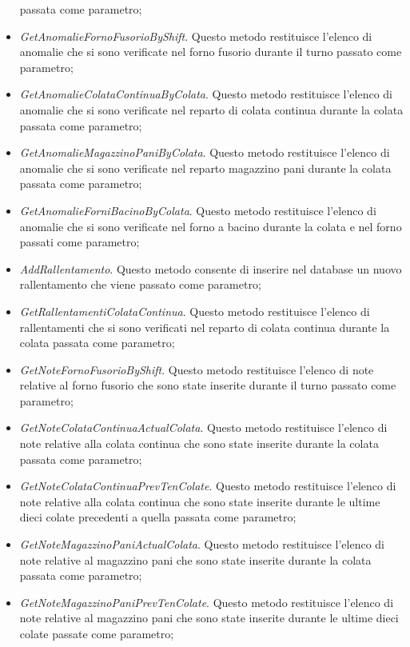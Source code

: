\begin{itemize}
    passata come parametro;
    \item \textit{GetAnomalieFornoFusorioByShift}. Questo metodo restituisce l'elenco di anomalie che si sono
    verificate nel forno fusorio durante il turno passato come parametro;
    \item \textit{GetAnomalieColataContinuaByColata}. Questo metodo restituisce l'elenco di anomalie che si sono
    verificate nel reparto di colata continua durante la colata passata come parametro;
    \item \textit{GetAnomalieMagazzinoPaniByColata}. Questo metodo restituisce l'elenco di anomalie che si sono
    verificate nel reparto magazzino pani durante la colata passata come parametro;
    \item \textit{GetAnomalieForniBacinoByColata}. Questo metodo restituisce l'elenco di anomalie che si sono
    verificate nel forno a bacino durante la colata e nel forno passati come parametro;
    \item \textit{AddRallentamento}. Questo metodo consente di inserire nel database un nuovo rallentamento che
    viene passato come parametro;
    \item \textit{GetRallentamentiColataContinua}. Questo metodo restituisce l'elenco di rallentamenti che si sono
    verificati nel reparto di colata continua durante la colata passata come parametro;
    \item \textit{GetNoteFornoFusorioByShift}. Questo metodo restituisce l'elenco di note relative al forno fusorio che
    sono state inserite durante il turno passato come parametro;
    \item \textit{GetNoteColataContinuaActualColata}. Questo metodo restituisce l'elenco di note relative alla colata
    continua che sono state inserite durante la colata passata come parametro;
    \item \textit{GetNoteColataContinuaPrevTenColate}. Questo metodo restituisce l'elenco di note relative alla colata
    continua che sono state inserite durante le ultime dieci colate precedenti a quella passata come parametro;
    \item \textit{GetNoteMagazzinoPaniActualColata}. Questo metodo restituisce l'elenco di note relative al magazzino
    pani che sono state inserite durante la colata passata come parametro;
    \item \textit{GetNoteMagazzinoPaniPrevTenColate}. Questo metodo restituisce l'elenco di note relative al magazzino
    pani che sono state inserite durante le ultime dieci colate passate come parametro;

\end{itemize}
